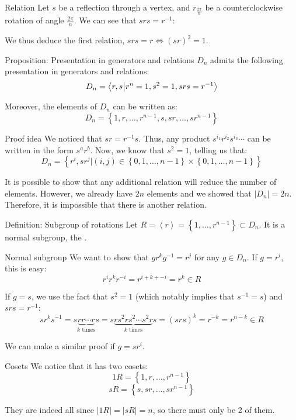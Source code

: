 \documentclass[a4paper]{article}
\begin{document}
\begin{parag}{Relation}
    Let $s$ be a reflection through a vertex, and $r_{\frac{2\pi}{n}}$ be a counterclockwise rotation of angle $\frac{2\pi}{n}$. We can see that $srs = r^{-1}$:

    We thus deduce the first relation, $srs = r \iff \left(sr\right)^2 = 1$.
\end{parag}

\begin{parag}{Proposition: Presentation in generators and relations}
    $D_n$ admits the following presentation in generators and relations: 
    \[D_n = \braket{r,s}{r^n = 1, s^2 = 1, srs = r^{-1}}\]

    Moreover, the elements of $D_n$ can be written as: 
    \[D_n = \left\{1, r, \ldots, r^{n-1}, s, sr, \ldots, sr^{n-1}\right\}\]

    \begin{subparag}{Proof idea}
        We noticed that $sr = r^{-1} s$. Thus, any product $s ^{i_1} r^{i_2} s ^{i_3} \cdots$ can be written in the form $s^a r^b$. Now, we know that $s^2 = 1$, telling us that: 
        \[D_n = \left\{r^i, s r^j | \left(i, j\right) \in \left\{0, 1, \ldots, n-1\right\} \times \left\{0, 1, \ldots, n-1\right\}\right\}\]
        
        It is possible to show that any additional relation will reduce the number of elements. However, we already have $2n$ elements and we showed that $\left|D_n\right| = 2n$. Therefore, it is impossible that there is another relation.
    \end{subparag}
\end{parag}

\begin{parag}{Definition: Subgroup of rotations}
    Let $R = \left\langle r \right\rangle = \left\{1, \ldots, r^{n-1}\right\} \subset D_n$. It is a normal subgroup, the .

    \begin{subparag}{Normal subgroup}
        We want to show that $g r^k g^{-1} = r^j$ for any $g \in D_n$. If $g = r^i$, this is easy: 
        \[r^{i} r^k r^{-i} = r^{i + k + -i} = r^k \in R\]
        
        If $g = s$, we use the fact that $s^2 = 1$ (which notably implies that $s ^{-1} = s$) and $s r s = r^{-1}$: 
        \[s  r^k s ^{-1} = s \underbrace{r r \cdots r}_{k \text{ times}} s = s \underbrace{r s^2 r s^2 \cdots s^2 r}_{k \text{ times}} s = \left(srs\right)^k = r^{-k} = r^{n -k}\in R\]

        We can make a similar proof if $g = s r^i$.
    \end{subparag}
    
    \begin{subparag}{Cosets}
        We notice that it has two cosets: 
        \[1R = \left\{1, r, \ldots, r^{n-1}\right\}\]
        \[sR = \left\{s, sr, \ldots, sr^{n-1}\right\}\]
        
        They are indeed all since $\left|1R\right| = \left|sR\right|= n$, so there must only be 2 of them.
    \end{subparag}
\end{parag}
\end{document}

